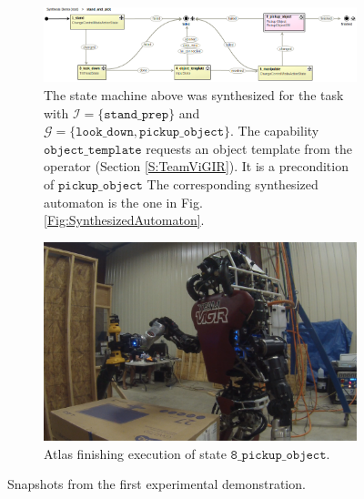 \begin{figure}[t]
	\centering
	\begin{subfigure}[b]{0.999\columnwidth}
	\includegraphics[width=0.99\columnwidth,clip]{./img/stand_and_pick_sm.png}
	\caption{
	The state machine above was synthesized for the task with $\mathcal{I} = \{ \mathtt{stand\_prep} \}$ and $\mathcal{G} = \{ \mathtt{look\_down}, \mathtt{pickup\_object} \}$.
	The capability $\mathtt{object\_template}$ requests an object template from the operator (Section \ref{S:TeamViGIR}).
	It is a precondition of $\mathtt{pickup\_object}$
	The corresponding synthesized automaton is the one in Fig. \ref{Fig:SynthesizedAutomaton}.
	}
	\label{Fig:stand_and_pick_sm}
	\end{subfigure}
	
	\vspace{4 pt}
	\begin{subfigure}[b]{0.95\columnwidth}
	\includegraphics[width=0.99\columnwidth, clip]{./img/stand_and_pick_gopro.png}
	\caption{Atlas finishing execution of state $\mathtt{8\_pickup\_object}$.
	} 
	\label{Fig:stand_and_pick_gopro}
	\end{subfigure}
	\caption{
	Snapshots from the first experimental demonstration.
	}
	\label{Fig:stand_and_pick_demo}
	\vspace{-10 pt}
\end{figure}

